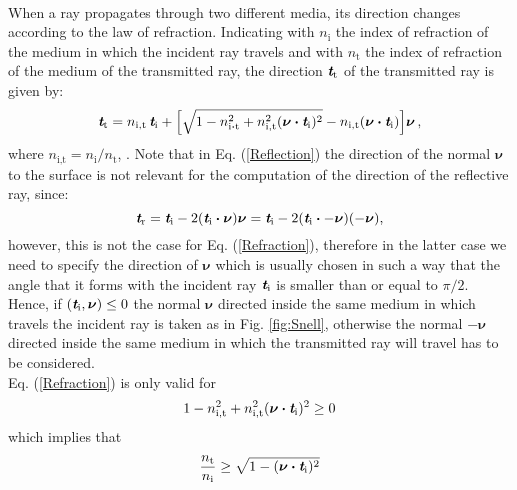 \\ When a ray propagates through two different media, its direction changes according to the law of refraction. 
Indicating with $n_\textrm{i}$ the index of refraction of the medium in which the incident ray travels and with 
$n_\textrm{t}$ the index of refraction of the medium of the transmitted ray, the direction $\textit{\textbf{t}}_\textrm{t}$ of the transmitted ray is given by:
\begin{equation}\label{Refraction}
\textit{\textbf{t}}_\textrm{t} = n_{\textrm{i},\textrm{t}}\,\textit{\textbf{t}}_\textrm{i}+
\Big[\sqrt{1-n_{\textrm{i}\boldsymbol{\cdot}\textrm{t}}^2+
n_{\textrm{i},\textrm{t}}^2(\boldsymbol{\nu}\boldsymbol{\cdot}\textit{\textbf{t}}_\textrm{i})^2}
-n_{\textrm{i},\textrm{t}}(\boldsymbol{\nu}\boldsymbol{\cdot}\textit{\textbf{t}}_\textrm{i}) \Big]\boldsymbol{\nu}\,,
\end{equation}
where $n_{\textrm{i},\textrm{t}}=n_\textrm{i}/n_\textrm{t}$, \cite{chaves2015introduction}.
 Note that in Eq. (\ref{Reflection}) the direction of the normal $\boldsymbol{\nu}$ to the surface is not relevant for the computation of the direction of the reflective ray, since:
\begin{equation}
\textit{\textbf{t}}_\textrm{r} = \textit{\textbf{t}}_\textrm{i}-2(\textit{\textbf{t}}_\textrm{i}\boldsymbol{\cdot}\boldsymbol{\nu})\boldsymbol{\nu}= \textit{\textbf{t}}_\textrm{i}-2(\textit{\textbf{t}}_\textrm{i}\boldsymbol{\cdot}-\boldsymbol{\nu})(-\boldsymbol{\nu}) ,
\end{equation}
however, this is not the case for Eq. (\ref{Refraction}), therefore in the latter case we need to specify the direction of $\boldsymbol{\nu}$ which is usually chosen in such a way that the angle that it forms with the incident ray $\textit{\textbf{t}}_\textrm{i}$ is smaller than or equal to $\pi/2$. Hence, if $(\textit{\textbf{t}}_\textrm{i}, \boldsymbol{\nu})\leq0$ the normal $\boldsymbol{\nu}$ directed inside the same medium in which travels the incident ray is taken as in Fig. \ref{fig:Snell}, 
otherwise the normal $-\boldsymbol{\nu}$ directed inside the same medium in which the transmitted ray will travel has to be considered.
\\\indent
Eq. (\ref{Refraction}) is only valid for 
\begin{equation}\label{tir}
1-n_{\textrm{i},\textrm{t}}^2+n_{\textrm{i},\textrm{t}}^2(\boldsymbol{\nu}\boldsymbol{\cdot}\textit{\textbf{t}}_\textrm{i})^2\geq 0 
\end{equation} which implies that
\begin{equation}
\frac{n_\textrm{t}}{n_\textrm{i}}\geq \sqrt{1-(\boldsymbol{\nu}\boldsymbol{\cdot}\textit{\textbf{t}}_\textrm{i})^2}
\end{equation}
